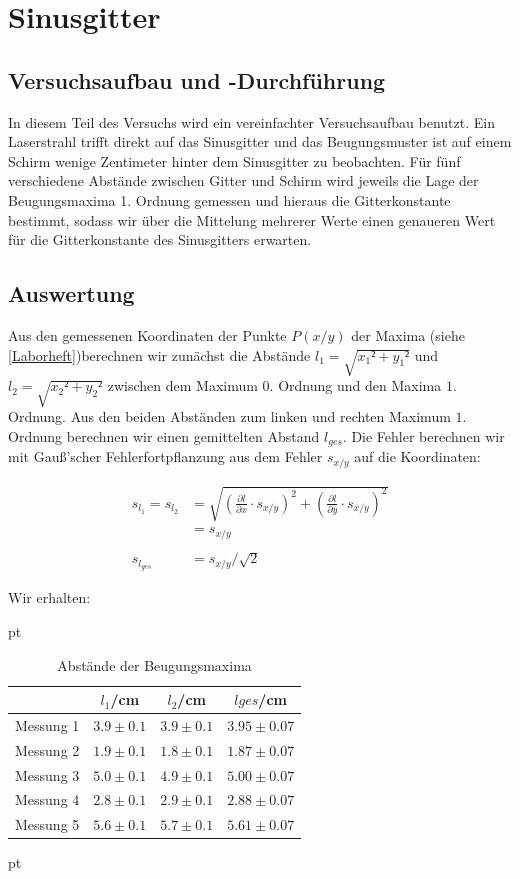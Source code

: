 \documentclass[12pt]{article}
\newcommand{\del}[2][]{\frac{\partial #1}{\partial #2}}
\begin{document}
\newpage
\section{Sinusgitter}

\newpage
\subsection{Versuchsaufbau und -Durchführung}

In diesem Teil des Versuchs wird ein vereinfachter Versuchsaufbau benutzt. Ein Laserstrahl trifft direkt auf das Sinusgitter und das Beugungsmuster ist auf einem Schirm wenige Zentimeter hinter dem Sinusgitter zu beobachten. Für fünf verschiedene Abstände zwischen Gitter und Schirm wird jeweils die Lage der Beugungsmaxima 1. Ordnung gemessen und hieraus die Gitterkonstante bestimmt, sodass wir über die Mittelung mehrerer Werte einen genaueren Wert für die Gitterkonstante des Sinusgitters erwarten.



\newpage
\subsection{Auswertung}

Aus den gemessenen Koordinaten der Punkte $P(x/y)$ der Maxima (siehe \ref{Laborheft})berechnen wir zunächst die Abstände $l_1 = \sqrt{x_1²+y_1²}$ und $l_2= \sqrt{x_2²+y_2²} $ zwischen dem Maximum $0.$ Ordnung und den Maxima $1.$ Ordnung. Aus den beiden Abständen zum linken und rechten Maximum $1.$ Ordnung berechnen wir einen gemittelten Abstand $l_{ges}$. Die Fehler berechnen wir mit Gauß'scher Fehlerfortpflanzung aus dem Fehler $s_{x/y}$ auf die Koordinaten:

\begin{align*}
s_{l_1} = s_{l_2} &= \sqrt{\left(\del[l]{x}\cdot s_{x/y}\right)^2+\left(\del[l]{y}\cdot s_{x/y}\right)^2}\\
&= s_{x/y}\\
\  \\
s_{l_{ges}} &= s_{x/y}/\sqrt{2}
\end{align*}

Wir erhalten:

  pt
 \begin{table}[h!]
 {\centering{}
\begin{tabular}{c||c|c|c}
 					& $l_1$/cm 	& $l_2$/cm & $l{ges}$/cm	\\ \hline\hline
Messung 1		& $3.9 \pm 0.1$ 	&  $3.9 \pm 0.1$    	&  $3.95 \pm 0.07$ \\ \hline 
Messung 2	&	 $1.9 \pm 0.1$ 	   	&  $1.8 \pm 0.1$  	&  $1.87 \pm 0.07$  \\ \hline
Messung 3      	&  $5.0 \pm 0.1$  	&  $4.9 \pm 0.1$  &  $5.00 \pm 0.07$  \\ \hline
Messung 4    & $2.8 \pm 0.1$ & $2.9 \pm 0.1$ &   $2.88 \pm 0.07$        \\ \hline                                           
Messung 5  & $5.6 \pm 0.1$  & $5.7 \pm 0.1$ & $5.61 \pm 0.07$
 \end{tabular}}
 \caption{Abstände der Beugungsmaxima}
\end{table}
 pt
\end{document}
